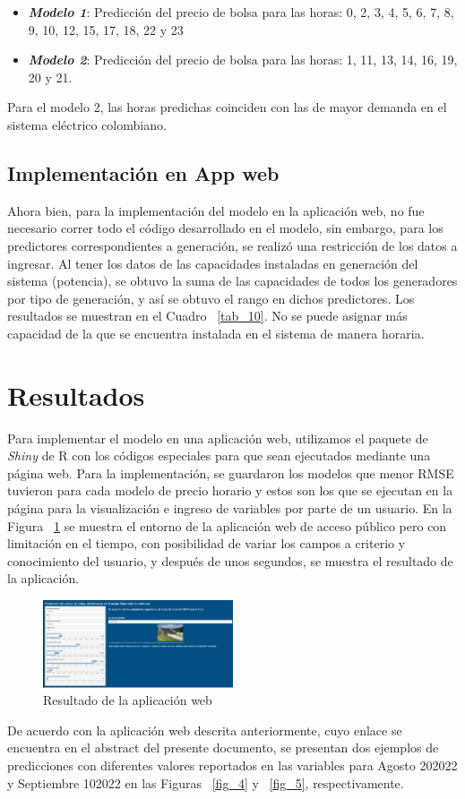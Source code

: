 \documentclass[conference, 10pt]{IEEEtran}
\begin{document}
\begin{itemize}
\item \textit{\textbf{Modelo 1}}: Predicción del precio de bolsa para las horas: 0, 2, 3, 4, 5, 6, 7, 8, 9, 10, 12, 15, 17, 18, 22 y 23\item\textit{\textbf{Modelo 2}}: Predicción del precio de bolsa para las horas: 1, 11, 13, 14, 16, 19, 20 y 21.
\end{itemize}

Para el modelo 2, las horas predichas coinciden con las de mayor demanda en el sistema eléctrico colombiano. 

\subsection{Implementación en App web}
Ahora bien, para la implementación del modelo en la aplicación web, no fue necesario correr todo el código desarrollado en el modelo, sin embargo, para los predictores correspondientes a generación, se realizó una restricción de los datos a ingresar. Al tener los datos de las capacidades instaladas en generación del sistema (potencia), se obtuvo la suma de las capacidades de todos los generadores por tipo de generación, y así se obtuvo el rango en dichos predictores. Los resultados se muestran en el Cuadro ~\ref{tab_10}. No se puede asignar más capacidad de la que se encuentra instalada en el sistema de manera horaria.  
\section{Resultados}
Para implementar el modelo en una aplicación web, utilizamos el paquete de \textit{Shiny} de R con los códigos especiales para que sean ejecutados mediante una página web. Para la implementación, se guardaron los modelos que menor RMSE tuvieron para cada modelo de precio horario y estos son los que se ejecutan en la página para la visualización e ingreso de variables por parte de un usuario. En la Figura ~\ref{fig_3} se muestra el entorno de la aplicación web de acceso público pero con limitación en el tiempo, con posibilidad de variar los campos a criterio y conocimiento del usuario, y después de unos segundos, se muestra el resultado de la aplicación. 

\begin{figure}[htbp]
\centerline{\includegraphics[width=0.5\textwidth]{../Images/Resultado_Trabajo_final.png}}
\caption{Resultado de la aplicación web}
\label{fig_3}
\end{figure}
De acuerdo con la aplicación web descrita anteriormente, cuyo enlace se encuentra en el abstract del presente documento, se presentan dos ejemplos de predicciones con diferentes valores reportados en las variables para Agosto 20\/2022 y Septiembre 10\/2022 en las Figuras ~\ref{fig_4}  y ~\ref{fig_5}, respectivamente.
\end{document}
